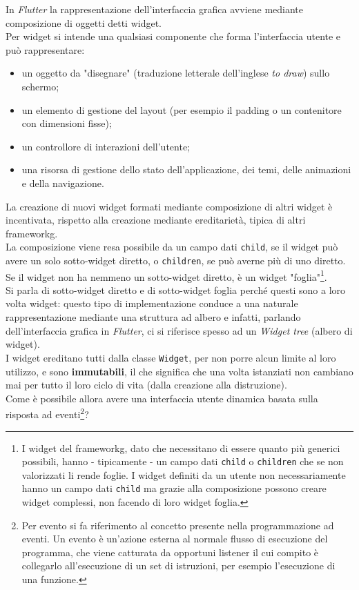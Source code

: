 In \emph{Flutter} la rappresentazione dell'interfaccia grafica avviene mediante composizione di oggetti detti widget.\\
Per widget si intende una qualsiasi componente che forma l'interfaccia utente e può rappresentare: 
\begin{itemize}
    \item un oggetto da "disegnare" (traduzione letterale dell'inglese \emph{to draw}) sullo schermo;
    \item un elemento di gestione del layout (per esempio il padding o un contenitore con dimensioni fisse);
    \item un controllore di interazioni dell'utente;
    \item una risorsa di gestione dello stato dell'applicazione, dei temi, delle animazioni e della navigazione.
\end{itemize}
La creazione di nuovi widget formati mediante composizione di altri widget è incentivata, rispetto alla creazione mediante ereditarietà, tipica di altri \gls{frameworkg}.\\
La composizione viene resa possibile da un campo dati \texttt{child}, se il widget può avere un solo sotto-widget diretto, o \texttt{children}, se può averne più di uno diretto. Se il widget non ha nemmeno un sotto-widget diretto, è un widget "foglia"\footnote{I widget del \gls{frameworkg}, dato che necessitano di essere quanto più generici possibili, hanno - tipicamente - un campo dati \texttt{child} o \texttt{children} che se non valorizzati li rende foglie. I widget definiti da un utente non necessariamente hanno un campo dati \texttt{child} ma grazie alla composizione possono creare widget complessi, non facendo di loro widget foglia.}.\\
Si parla di sotto-widget diretto e di sotto-widget foglia perché questi sono a loro volta widget: questo tipo di implementazione conduce a una naturale rappresentazione mediante una struttura ad albero e infatti, parlando dell'interfaccia grafica in \emph{Flutter}, ci si riferisce spesso ad un \emph{Widget tree} (albero di widget).\\
I widget ereditano tutti dalla classe \texttt{Widget}, per non porre alcun limite al loro utilizzo, e sono \textbf{immutabili}, il che significa che una volta istanziati non cambiano mai per tutto il loro ciclo di vita (dalla creazione alla distruzione).\\
Come è possibile allora avere una interfaccia utente dinamica basata sulla risposta ad eventi\footnote{Per evento si fa riferimento al concetto presente nella programmazione ad eventi. Un evento è un'azione esterna al normale flusso di esecuzione del programma, che viene catturata da opportuni listener il cui compito è collegarlo all'esecuzione di un set di istruzioni, per esempio l'esecuzione di una funzione.}?

